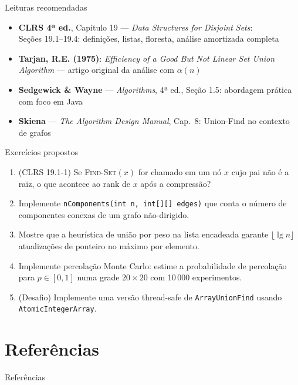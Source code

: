 \documentclass[aspectratio=169]{beamer}
\begin{document}
\begin{frame}{Leituras recomendadas}%
  \begin{itemize}
    \item \textbf{CLRS 4ª ed.}, Capítulo 19 — \textit{Data Structures for Disjoint Sets}:\\
      Seções 19.1–19.4: definições, listas, floresta, análise amortizada completa
    \item \textbf{Tarjan, R.E. (1975)}: \textit{Efficiency of a Good But Not Linear Set Union Algorithm} — artigo original da análise com $\alpha(n)$
    \item \textbf{Sedgewick \& Wayne} — \textit{Algorithms}, 4ª ed., Seção 1.5: abordagem prática com foco em Java
    \item \textbf{Skiena} — \textit{The Algorithm Design Manual}, Cap.\ 8: Union-Find no contexto de grafos
  \end{itemize}
\end{frame}

\begin{frame}{Exercícios propostos}%
  \begin{enumerate}
    \item (CLRS 19.1-1) Se \textsc{Find-Set}$(x)$ for chamado em um nó $x$ cujo pai não é a raiz, o que acontece ao rank de $x$ após a compressão?
    \item Implemente \texttt{nComponents(int n, int[][] edges)} que conta o número de componentes conexas de um grafo não-dirigido.
    \item Mostre que a heurística de união por peso na lista encadeada garante $\lfloor\lg n\rfloor$ atualizações de ponteiro no máximo por elemento.
    \item Implemente percolação Monte Carlo: estime a probabilidade de percolação para $p \in [0,1]$ numa grade $20\times 20$ com 10\,000 experimentos.
    \item (Desafio) Implemente uma versão thread-safe de \texttt{ArrayUnionFind} usando \texttt{AtomicIntegerArray}.
  \end{enumerate}
\end{frame}

\section*{Referências}

\begin{frame}[allowframebreaks]{Referências}%
  \nocite{*}
  
  
\end{frame}
\end{document}
